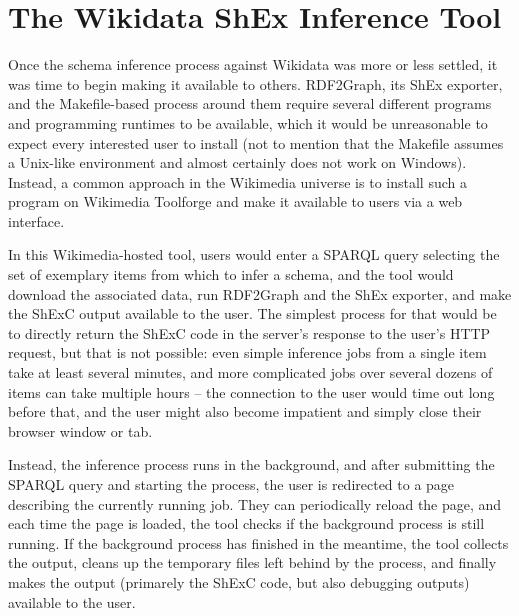 
\chapter{The Wikidata ShEx Inference Tool}
\label{ch:wdsi}


Once the schema inference process against Wikidata was more or less settled,
it was time to begin making it available to others. %
RDF2Graph, its ShEx exporter, and the Makefile-based process around them
require several different programs and programming runtimes to be available,
which it would be unreasonable to expect every interested user to install
(not to mention that the Makefile assumes a Unix-like environment and almost certainly does not work on Windows).
Instead, a common approach in the Wikimedia universe
is to install such a program on Wikimedia Toolforge
and make it available to users via a web interface.

In this Wikimedia-hosted tool,
users would enter a SPARQL query selecting the set of exemplary items from which to infer a schema,
and the tool would download the associated data,
run RDF2Graph and the ShEx exporter,
and make the ShExC output available to the user.
The simplest process for that would be
to directly return the ShExC code in the server’s response to the user’s HTTP request,
but that is not possible:
even simple inference jobs %
from a single item take at least several minutes,
and more complicated jobs %
over several dozens of items can take multiple hours –
the connection to the user would time out long before that,
and the user might also become impatient and simply close their browser window or tab.

Instead, the inference process runs in the background,
and after submitting the SPARQL query and starting the process,
the user is redirected to a page describing the currently running job.
They can periodically reload the page,
and each time the page is loaded,
the tool checks if the background process is still running.
If the background process has finished in the meantime,
the tool collects the output,
cleans up the temporary files left behind by the process,
and finally makes the output
(primarely the ShExC code, but also debugging outputs)
available to the user.

